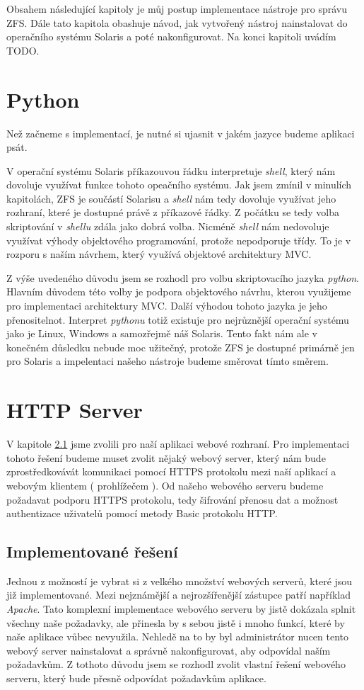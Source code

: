 Obsahem následující kapitoly je můj postup implementace nástroje pro správu ZFS. Dále tato kapitola obashuje návod, jak vytvořený nástroj nainstalovat do operačního systému Solaris a poté nakonfigurovat. Na konci kapitoli uvádím TODO.
\section{Python}
Než začneme s implementací, je nutné si ujasnit v jakém jazyce budeme aplikaci psát.

V operační systému Solaris příkazouvou řádku interpretuje \emph{shell}, který nám dovoluje využívat funkce tohoto opeačního systému. Jak jsem zmínil v minulích kapitolách, ZFS je součástí Solarisu a \emph{shell} nám tedy dovoluje využívat jeho rozhraní, které je dostupné právě z příkazové řádky. Z počátku se tedy volba skriptování v \emph{shellu} zdála jako dobrá volba. Nicméně \emph{shell} nám nedovoluje využívat výhody objektového programování, protože nepodporuje třídy. To je v rozporu s naším návrhem, který využívá objektové architektury MVC.

Z výše uvedeného důvodu jsem se rozhodl pro volbu skriptovacího jazyka \emph{python}. Hlavním důvodem této volby je podpora objektového návrhu, kterou využijeme pro implementaci architektury MVC. Další výhodou tohoto jazyka je jeho přenositelnot. Interpret \emph{pythonu} totiž existuje pro nejrůznější operační systému jako je Linux, Windows a samozřejmě náš Solaris. Tento fakt nám ale v konečném důsledku nebude moc užitečný, protože ZFS je dostupné primárně jen pro Solaris a impelentaci našeho nástroje budeme směrovat tímto směrem.
\section{HTTP Server}
V kapitole \ref{} jsme zvolili pro naší aplikaci webové rozhraní. Pro implementaci tohoto řešení budeme muset zvolit nějaký webový server, který nám bude zprostředkovávát komunikaci pomocí HTTPS protokolu mezi naší aplikací a webovým klientem ( prohlížečem ). Od našeho webového serveru budeme požadavat podporu HTTPS protokolu, tedy šifrování přenosu dat a možnost authentizace uživatelů pomocí metody Basic protokolu HTTP.
    \subsection{Implementované řešení}
    Jednou z možností je vybrat si z velkého množství webových serverů, které jsou již implementované. Mezi nejznámější a nejrozšířenější zástupce patří například \emph{Apache}. Tato komplexní implementace webového serveru by jistě dokázala splnit všechny naše požadavky, ale přinesla by s sebou jistě i mnoho funkcí, které by naše aplikace vůbec nevyužila. Nehledě na to by byl administrátor nucen tento webový server nainstalovat a správně nakonfigurovat, aby odpovídal naším požadavkům. Z tothoto důvodu jsem se rozhodl zvolit vlastní řešení webového serveru, který bude přesně odpovídat požadavkům aplikace.

